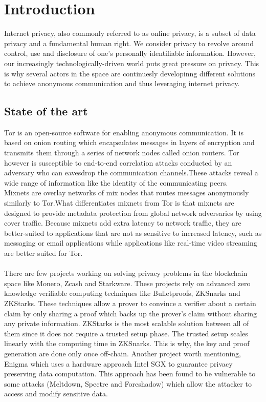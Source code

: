 
\begin{abstract}

\end{abstract}
\section{Introduction}
Internet privacy, also commonly referred to as online privacy, is a subset of data privacy and a fundamental human right. We consider privacy to revolve around control, use and disclosure of one’s personally identifiable information.
However, our increasingly technologically-driven world puts great pressure on privacy. 
This is why several actors in the space are continuesly developinng different solutions to achieve anonymous communication and thus leveraging internet privacy.


\subsection*{State of the art}
Tor is an open-source software for enabling anonymous communication. It is based on onion routing which encapsulates messages in layers of encryption and transmits them through a series of network nodes called onion routers. Tor however is susceptible to end-to-end correlation attacks conducted by an adversary who can eavesdrop the communication channels.These attacks reveal a wide range of information like the identity of the communicating peers.
\\Mixnets are overlay networks of mix nodes that routes messages anonymously similarly to Tor.What differentiates mixnets from Tor is that mixnets are designed to provide metadata protection from global network adversaries by using cover traffic. Because mixnets add extra latency to network traffic, they are better-suited to applications that are not as sensitive to increased latency, such as messaging or email applications while applications like real-time video streaming are better suited for Tor. 
\\~\\There are few projects working on solving privacy problems in the blockchain space like Monero, Zcash and Starkware. These projects rely on advanced zero knowledge verifiable computing techniques like Bulletproofs, ZKSnarks  and ZKStarks. These techniques allow a prover to convince a verifier about a certain claim by only sharing a proof which backs up the prover’s claim without sharing any private information. ZKStarks is the most scalable solution between all of them since it does not require a trusted setup phase. The trusted setup scales linearly with the computing time in ZKSnarks. This is why, the key and proof generation are done only once off-chain. 
Another project worth mentioning, Enigma which uses a hardware approach Intel SGX to guarantee privacy preserving data computation. This approach has been found to be vulnerable to some attacks (Meltdown, Spectre and Foreshadow) which allow the attacker to access and modify sensitive data.






